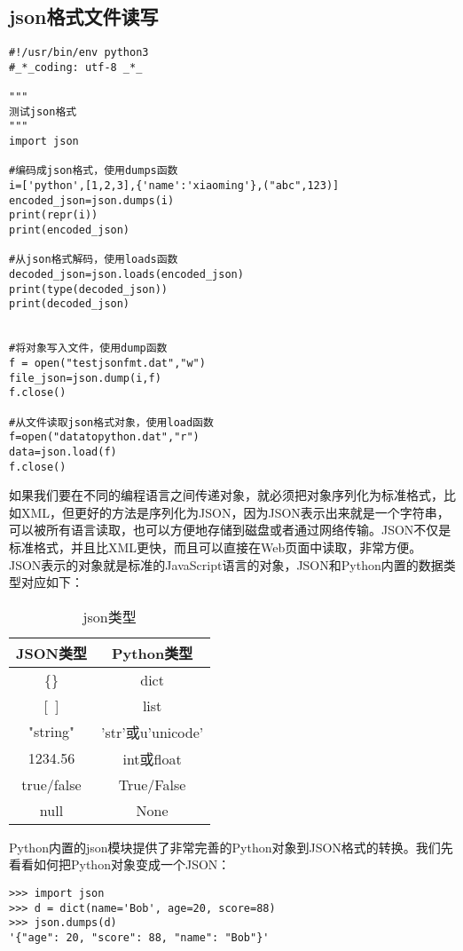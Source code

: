 \documentclass[twoside,11pt]{book}
\begin{document}
\subsection{json格式文件读写}
\begin{lstlisting}
#!/usr/bin/env python3
#_*_coding: utf-8 _*_

"""
测试json格式
"""
import json

#编码成json格式，使用dumps函数
i=['python',[1,2,3],{'name':'xiaoming'},("abc",123)]
encoded_json=json.dumps(i)
print(repr(i))
print(encoded_json)

#从json格式解码，使用loads函数
decoded_json=json.loads(encoded_json)
print(type(decoded_json))
print(decoded_json)


#将对象写入文件，使用dump函数
f = open("testjsonfmt.dat","w")
file_json=json.dump(i,f)
f.close()

#从文件读取json格式对象，使用load函数
f=open("datatopython.dat","r")
data=json.load(f)
f.close()
\end{lstlisting}


如果我们要在不同的编程语言之间传递对象，就必须把对象序列化为标准格式，比如XML，但更好的方法是序列化为JSON，因为JSON表示出来就是一个字符串，可以被所有语言读取，也可以方便地存储到磁盘或者通过网络传输。JSON不仅是标准格式，并且比XML更快，而且可以直接在Web页面中读取，非常方便。
JSON表示的对象就是标准的JavaScript语言的对象，JSON和Python内置的数据类型对应如下：
\begin{table}
  \centering
  \begin{tabular}{cc}
  \hline
    JSON类型 & Python类型\\ \hline
    \{\} & dict\\
    \mbox{[ ]}& list\\
    "string" & 'str'或u'unicode'\\
    1234.56 & 	int或float\\
    true/false & 	True/False\\
    null &	None\\
  \hline
\end{tabular}
  \caption{json类型}\label{tab:json:type}
\end{table}

Python内置的json模块提供了非常完善的Python对象到JSON格式的转换。我们先看看如何把Python对象变成一个JSON：
\begin{lstlisting}
>>> import json
>>> d = dict(name='Bob', age=20, score=88)
>>> json.dumps(d)
'{"age": 20, "score": 88, "name": "Bob"}'
\end{lstlisting}
\end{document}
